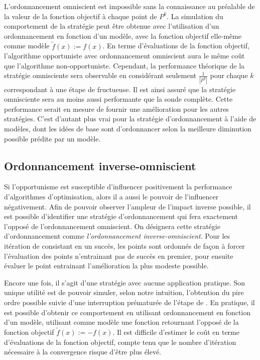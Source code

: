 L'ordonnancement omniscient est impossible sans la connaissance au préalable de la valeur de la fonction objectif à chaque point de $P^k$.
La simulation du comportement de la stratégie peut être obtenue avec l'utilisation d'un ordonnancement en fonction d'un modèle, avec la fonction objectif elle-même comme modèle $\tilde{f}(x):=f(x)$. En terme d'évaluations de la fonction objectif, l'algorithme opportuniste avec ordonnancement omniscient aura le même coût que l'algorithme non-opportuniste. Cependant, la performance théorique de la stratégie omnisciente sera observable en considérant seulement $\frac{1}{|P^k|}$ pour chaque $k$ correspondant à une étape de \POLL fructueuse. Il est ainsi assuré que la stratégie omnisciente sera au moins aussi performante que la sonde complète. Cette performance serait en mesure de fournir une amélioration pour les autres stratégies. C'est d'autant plus vrai pour la stratégie d'ordonnancement à l'aide de modèles, dont les idées de base sont d'ordonnancer selon la meilleure diminution possible prédite par un modèle.
\subsection{Ordonnancement inverse-omniscient}\label{sec:neg}
Si l'opportunisme est susceptible d'influencer positivement la performance d'algorithmes d'optimisation, alors il a aussi le pouvoir de l'influencer négativement. Afin de pouvoir observer l'ampleur de l'impact inverse possible, il est possible d'identifier une stratégie d'ordonnancement qui fera exactement l'opposé de l'ordonnancement omniscient. On désignera cette stratégie d'ordonnancement comme \emph{l'ordonnancement inverse-omniscient}. Pour les itération de \POLL consistant en un succès, les points sont ordonnés de façon à forcer l'évaluation des points n'entrainant pas de succès en premier, pour ensuite évaluer le point entrainant l'amélioration la plus modeste possible.  
  
Encore une fois, il s'agit d'une stratégie avec aucune application pratique. Son unique utilité est de pouvoir simuler, selon notre intuition, l'obtention du pire ordre possible suivie d'une interruption prématurée de l'étape de \POLL. En pratique, il est possible d'obtenir ce comportement en utilisant ordonnancement en fonction d'un modèle, utilisant comme modèle une fonction retournant l'opposé de la fonction objectif $\tilde{f}(x):=-f(x)$. Il est difficile d'estimer le coût en terme d'évaluations de la fonction objectif, compte tenu que le nombre d'itération nécessaire à la convergence risque d'être plus élevé.  

